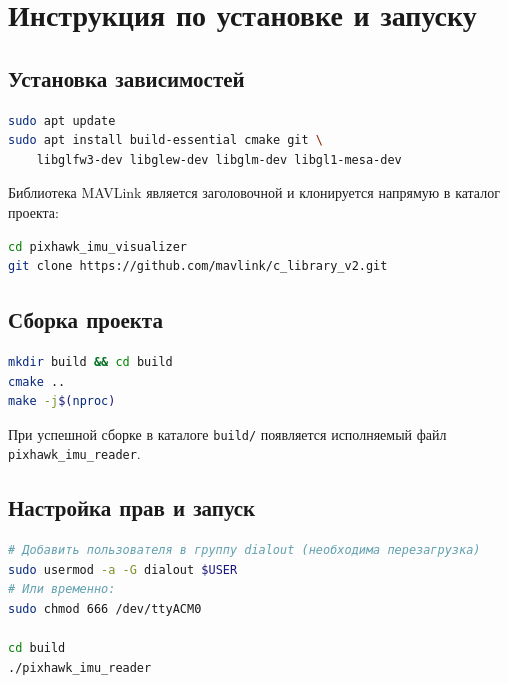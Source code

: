 \newpage
 
\section{Инструкция по установке и запуску}
 
\subsection{Установка зависимостей}
 
\begin{lstlisting}[language=bash,caption={Установка системных зависимостей (Ubuntu)}]
sudo apt update
sudo apt install build-essential cmake git \
    libglfw3-dev libglew-dev libglm-dev libgl1-mesa-dev
\end{lstlisting}
 
Библиотека MAVLink является заголовочной и клонируется напрямую в каталог
проекта:
 
\begin{lstlisting}[language=bash,caption={Клонирование MAVLink}]
cd pixhawk_imu_visualizer
git clone https://github.com/mavlink/c_library_v2.git
\end{lstlisting}
 
\subsection{Сборка проекта}
 
\begin{lstlisting}[language=bash,caption={Сборка через CMake}]
mkdir build && cd build
cmake ..
make -j$(nproc)
\end{lstlisting}
 
При успешной сборке в каталоге \texttt{build/} появляется исполняемый файл
\texttt{pixhawk\_imu\_reader}.
 
\subsection{Настройка прав и запуск}
 
\begin{lstlisting}[language=bash,caption={Права на порт и запуск}]
# Добавить пользователя в группу dialout (необходима перезагрузка)
sudo usermod -a -G dialout $USER
# Или временно:
sudo chmod 666 /dev/ttyACM0
 
cd build
./pixhawk_imu_reader
\end{lstlisting}
 
